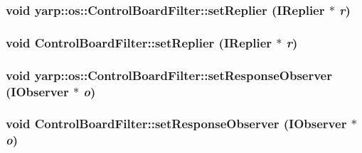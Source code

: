\label{classyarp_1_1os_1_1_control_board_filter_a2500ae8300c6ca835f5b25133e1d04ed}
\hypertarget{classyarp_1_1os_1_1_control_board_filter_a67e1c7b532ab58bb42f7c20ec2d5d2ce}{
\subsubsection[{setReplier}]{\setlength{\rightskip}{0pt plus 5cm}void yarp::os::ControlBoardFilter::setReplier ({\bf IReplier} $\ast$ {\em r})}}
\label{classyarp_1_1os_1_1_control_board_filter_a67e1c7b532ab58bb42f7c20ec2d5d2ce}
\hypertarget{classyarp_1_1os_1_1_control_board_filter_a6d3b3916553af9221093518d93c49c99}{
\subsubsection[{setReplier}]{\setlength{\rightskip}{0pt plus 5cm}void ControlBoardFilter::setReplier ({\bf IReplier} $\ast$ {\em r})}}
\label{classyarp_1_1os_1_1_control_board_filter_a6d3b3916553af9221093518d93c49c99}
\hypertarget{classyarp_1_1os_1_1_control_board_filter_a9e6db13ba589309cfca6667735c29297}{
\subsubsection[{setResponseObserver}]{\setlength{\rightskip}{0pt plus 5cm}void yarp::os::ControlBoardFilter::setResponseObserver ({\bf IObserver} $\ast$ {\em o})}}
\label{classyarp_1_1os_1_1_control_board_filter_a9e6db13ba589309cfca6667735c29297}
\hypertarget{classyarp_1_1os_1_1_control_board_filter_acf3896d97b179e36d41d275087c33c4e}{
\subsubsection[{setResponseObserver}]{\setlength{\rightskip}{0pt plus 5cm}void ControlBoardFilter::setResponseObserver ({\bf IObserver} $\ast$ {\em o})}}

